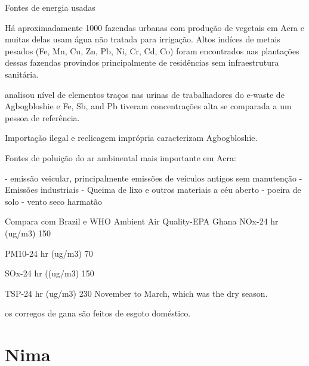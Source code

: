 
\begin{table}[H]
 \centering
  
  \caption{Fontes de energia usadas \cite{censu2013}}
\end{table}

Há aproximadamente 1000 fazendas urbanas com produção de vegetais em Acra e 
muitas delas usam água não tratada para irrigação. Altos indíces de 
metais pesados (Fe, Mn, Cu, Zn, Pb, Ni, Cr, Cd, Co)
foram encontrados nas plantações dessas fazendas \cite{lente2014} provindos 
principalmente de residências sem infraestrutura sanitária. 


\cite{asante2012} analisou nível de elementos traços nas urinas de trabalhadores 
do e-waste de Agbogbloshie e Fe, Sb, and Pb tiveram concentrações alta se comparada
a um pessoa de referência. 

Importação ilegal e reclicagem imprópria caracterizam Agbogbloshie.


Fontes de poluição do ar ambinental mais importante em Acra:

- emissão veicular, principalmente emissões de veículos antigos sem manutenção
- Emissões industriais
- Queima de lixo e outros materiais a céu aberto
- poeira de solo
- vento seco harmatão


Compara com Brazil e WHO
Ambient Air Quality-EPA Ghana
NOx-24 hr (ug/m3) 150

PM10-24 hr (ug/m3) 70

SOx-24 hr ((ug/m3) 150

TSP-24 hr (ug/m3) 230
 November to March, which was the dry season.


os corregos de gana são feitos de  esgoto doméstico.


\section{Nima}

